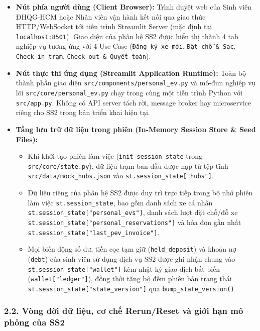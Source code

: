 \documentclass[11pt,a4paper]{article}
\providecommand{\tightlist}{%
  \setlength{\itemsep}{0pt}\setlength{\parskip}{0pt}}
\begin{document}
\begin{itemize}
\tightlist
\item
  \textbf{Nút phía người dùng (Client Browser):} Trình duyệt web của
  Sinh viên ĐHQG-HCM hoặc Nhân viên vận hành kết nối qua giao thức
  HTTP/WebSocket tới tiến trình Streamlit Server (mặc định tại
  \texttt{localhost:8501}). Giao diện của phân hệ SS2 được hiển thị
  thành 4 tab nghiệp vụ tương ứng với 4 Use Case
  (\texttt{Đăng\ ký\ xe\ mới}, \texttt{Đặt\ chỗ\ \&\ Sạc},
  \texttt{Check-in\ trạm}, \texttt{Check-out\ \&\ Quyết\ toán}).
\item
  \textbf{Nút thực thi ứng dụng (Streamlit Application Runtime):} Toàn
  bộ thành phần giao diện \texttt{src/components/personal\_ev.py} và
  mô-đun nghiệp vụ lõi \texttt{src/core/personal\_ev.py} chạy trong cùng
  một tiến trình Python với \texttt{src/app.py}. Không có API server
  tách rời, message broker hay microservice riêng cho SS2 trong bản
  triển khai hiện tại.
\item
  \textbf{Tầng lưu trữ dữ liệu trong phiên (In-Memory Session Store \&
  Seed Files):}

  \begin{itemize}
  \tightlist
  \item
    Khi khởi tạo phiên làm việc (\texttt{init\_session\_state} trong
    \texttt{src/core/state.py}), dữ liệu trạm ban đầu được nạp từ tệp
    tĩnh \texttt{src/data/mock\_hubs.json} vào
    \texttt{st.session\_state{[}"hubs"{]}}.
  \item
    Dữ liệu riêng của phân hệ SS2 được duy trì trực tiếp trong bộ nhớ
    phiên làm việc \texttt{st.session\_state}, bao gồm danh sách xe cá
    nhân \texttt{st.session\_state{[}"personal\_evs"{]}}, danh sách lượt
    đặt chỗ/đỗ xe
    \texttt{st.session\_state{[}"personal\_reservations"{]}} và hóa đơn
    gần nhất \texttt{st.session\_state{[}"last\_pev\_invoice"{]}}.
  \item
    Mọi biến động số dư, tiền cọc tạm giữ (\texttt{held\_deposit}) và
    khoản nợ (\texttt{debt}) của sinh viên sử dụng dịch vụ SS2 được ghi
    nhận chung vào \texttt{st.session\_state{[}"wallet"{]}} kèm nhật ký
    giao dịch bất biến (\texttt{wallet{[}"ledger"{]}}), đồng thời tăng
    bộ đếm phiên bản trạng thái
    \texttt{st.session\_state{[}"state\_version"{]}} qua
    \texttt{bump\_state\_version()}.
  \end{itemize}
\end{itemize}

\hypertarget{vuxf2ng-ux111ux1eddi-dux1eef-liux1ec7u-cux1a1-chux1ebf-rerunreset-vuxe0-giux1edbi-hux1ea1n-muxf4-phux1ecfng-cux1ee7a-ss2}{%
\subsubsection{2.2. Vòng đời dữ liệu, cơ chế Rerun/Reset và giới hạn mô
phỏng của
SS2}\label{vuxf2ng-ux111ux1eddi-dux1eef-liux1ec7u-cux1a1-chux1ebf-rerunreset-vuxe0-giux1edbi-hux1ea1n-muxf4-phux1ecfng-cux1ee7a-ss2}}
\end{document}
